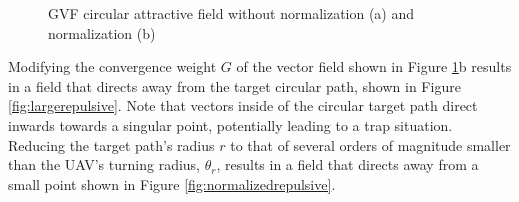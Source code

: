 \documentclass[numbered,pdftex]{ohio-etd}
\begin{document}
\begin{figure}[H]
	\begin{subfigmatrix}{2}%
		\centering	
		\hspace*{0mm}
	\end{subfigmatrix}
	\caption{GVF circular attractive field without normalization (a) and normalization (b)}
	\label{fig:gvfCircAttractive}
\end{figure}

Modifying the convergence weight $G$ of the vector field shown in Figure \ref{fig:gvfCircAttractive}b results in a field that directs away from the target circular path, shown in Figure \ref{fig:largerepulsive}. Note that vectors inside of the circular target path direct inwards towards a singular point, potentially leading to a trap situation. Reducing the target path's radius $r$ to that of several orders of magnitude smaller than the UAV's turning radius, $\theta_r$, results in a field that directs away from a small point shown in Figure \ref{fig:normalizedrepulsive}.
\end{document}
